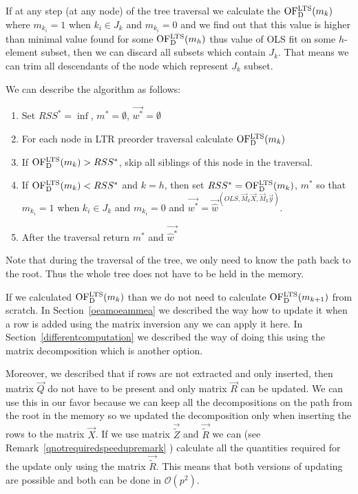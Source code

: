 If at any step (at any node) of the tree traversal we calculate the
$\operatorname{OF^{LTS}_D}(m_k)$ where $m_{k_i} = 1$ when $k_i \in J_k$ and $m_{k_i} = 0$ and we find out that this value is higher than minimal value found for some $\operatorname{OF^{LTS}_D}(m_h)$ thus value of OLS fit on some $h$-element subset, then we can discard all subsets which contain $J_k$. That means we can trim all descendants of the node which represent $J_k$ subset.

We can describe the algorithm as follows:

\begin{enumerate}
    \item Set $RSS^* = \inf$, $m^* = \emptyset$, $\vec{{w}^*} = \emptyset$ 
    \item For each node in LTR preorder traversal calculate $\operatorname{OF^{LTS}_D}(m_k)$
    \item If $\operatorname{OF^{LTS}_D}(m_k) > RSS^*$, skip all siblings of this node in the traversal.
    \item If $\operatorname{OF^{LTS}_D}(m_k) < RSS^* $ and $k = h$, then set $RSS^* = \operatorname{OF^{LTS}_D}(m_k)$, $m^*$ so that $m_{k_i} = 1$ when $k_i \in J_k$ and $m_{k_i} = 0$ and $\vec{{w}^*} = \vec{\hat{w}}^{(OLS,\vec{M}_{k}\vec{X}, \vec{M}_{k}\vec{y})}$.
 \item After the traversal return $m^*$ and $\vec{\hat{w}^*}$
\end{enumerate}

Note that during the traversal of the tree, we only need to know the path back to the root. Thus the whole tree does not have to be held in the memory. 

\begin{remark}
If we calculated $\operatorname{OF^{LTS}_D}(m_{k})$ than we do not need to calculate $\operatorname{OF^{LTS}_D}(m_{k+1})$ from scratch. In Section~\ref{oeamoeammea} we described the way how to update it when a row is added using the matrix inversion any we can apply it here. In Section~\ref{differentcomputation} we described the way of doing this using the matrix decomposition which is another option. 

Moreover, we described that if rows are not extracted and only inserted, then matrix $\vec{Q}$ do not have to be present and only matrix $\vec{R}$ can be updated. We can use this in our favor because we can keep all the decompositions on the path from the root in the memory so we updated the decomposition only when inserting the rows to the matrix $\vec{X}$.  If we use matrix $\vec{\tilde{Z}}$ and $\vec{\tilde{R}}$ we can  (see Remark~\ref{qnotrequiredspeedupremark} ) calculate all the quantities required for the update only using the matrix $\vec{\tilde{R}}$. This means that both versions of updating are possible and both can be done in $\mathcal{O}(p^2)$.
\end{remark}

